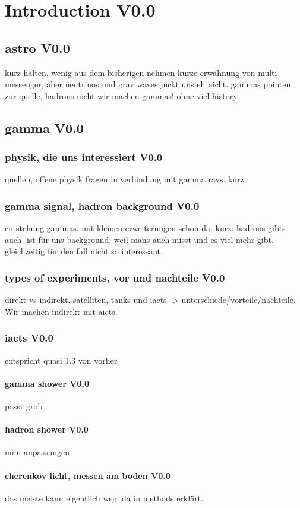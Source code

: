 \chapter{Introduction V0.0}
\section{astro V0.0}
kurz halten, wenig aus dem bisherigen nehmen
kurze erwähnung von multi messenger, aber neutrinos und 
grav waves juckt uns eh nicht.
gammas pointen zur quelle, hadrons nicht
wir machen gammas!
ohne viel history
\section{gamma V0.0}
\subsection{physik, die uns interessiert V0.0}
quellen, offene physik fragen in verbindung mit gamma rays.
kurz
\subsection{gamma signal, hadron background V0.0}
entstehung gammas. mit kleinen erweiterungen schon da.
kurz: hadrons gibts auch. ist für uns background, weil mans auch misst
und es viel mehr gibt. gleichzeitig für den fall nicht so interessant.
\subsection{types of experiments, vor und nachteile V0.0}
direkt vs indirekt.
satelliten, tanks und iacts -> unterschiede/vorteile/nachteile.
Wir machen indirekt mit aicts.
\subsection{iacts V0.0}
entspricht quasi 1.3 von vorher
\subsubsection{gamma shower V0.0}
passt grob
\subsubsection{hadron shower V0.0}
mini anpassungen
\subsubsection{cherenkov licht, messen am boden V0.0}
das meiste kann eigentlich weg, da in methods erklärt.

